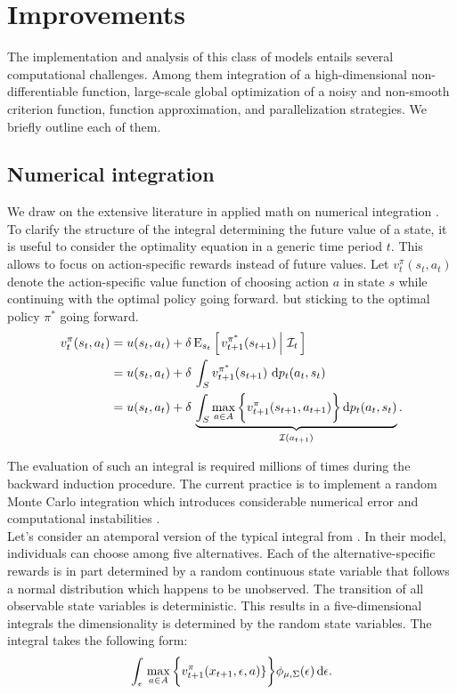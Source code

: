 \section{Improvements}\label{Computation}
The implementation and analysis of this class of models entails several computational challenges. Among them integration of a high-dimensional non-differentiable function, large-scale global optimization of a noisy and non-smooth criterion function, function approximation, and parallelization strategies. We briefly outline each of them.
\subsection{Numerical integration} We draw on the extensive literature in applied math on numerical integration \citep{Davis.2007}. To clarify the structure of the integral determining the future value of a state, it is useful to consider the optimality equation in a generic time period $t$. This allows to focus on action-specific rewards instead of future values. Let $v^{\pi}_{t}(s_t, a_t)$ denote the action-specific value function of choosing action $a$ in state $s$ while continuing with the optimal policy going forward.
but sticking to the optimal policy $\pi^*$ going forward.
%
\begin{align}
v^{\pi}_{t}(s_t, a_t) & = u(s_t, a_t) + \delta\,\mathrm{E}_{s_t} \left[\left.v^{\pi^*}_{t + 1}(s_{t + 1})\,\right\vert\,\mathcal{I}_t\,\right] \\
& =  u(s_t, a_t) + \delta\, \int_S v^{\pi^*}_{t + 1}(s_{t + 1})\, \mathop{}\!\mathrm{d} p_t(a_t, s_t)\\
& =  u(s_t, a_t) + \delta\, \underbrace{\int_S \max_{a \in A}\bigg\{v^\pi_{t + 1}(s_{t + 1}, a_{t + 1})\bigg\}\mathop{}\!\mathrm{d} p_t(a_t, s_t)}_{\mathcal{I}(a_{t + 1})}.
\end{align}

\noindent The evaluation of such an integral is required millions of times during the backward induction procedure. The current practice is to implement a random Monte Carlo integration which introduces considerable numerical error and computational instabilities \citep{Judd.2011}.\\

\noindent Let's consider an atemporal version of the typical integral from \citet{Keane.1997}. In their model, individuals can choose among five alternatives. Each of the alternative-specific rewards is in part determined by a random continuous state variable that follows a normal distribution which happens to be unobserved. The transition of all observable state variables is deterministic. This results in a five-dimensional integrals the dimensionality is determined by the random state variables. The integral takes the following form:
%
\begin{align*}
   \int_{\epsilon}\, \max_{a\in A} \bigg\{v_{t + 1}^\pi(x_{t + 1}, \epsilon, a)\}\bigg\} \phi_{\mu, \Sigma}(\epsilon) \mathop{}\!\mathrm{d}\epsilon.
\end{align*}

